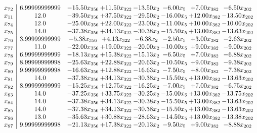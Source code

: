\documentclass[8pt]{article}
\begin{document}
\[\begin{array}{c| c c@{\hskip 2pt} c@{\hskip 2pt} c@{\hskip 2pt} c@{\hskip 2pt} c@{\hskip 2pt} c@{\hskip 2pt} }
 x_{72}   &  6.99999999999 & -15.50 x_{356} & + 11.50 x_{322} & -13.50 x_{2} & -6.00 x_{5} & +  7.00 x_{382} & -6.50 x_{202}\\
 x_{11}   &  12.0 & -39.50 x_{356} & + 37.50 x_{322} & -29.50 x_{2} & -16.00 x_{5} & + 12.00 x_{382} & -13.50 x_{202}\\
 x_{74}   &  12.0 & -25.00 x_{356} & + 22.00 x_{322} & -23.00 x_{2} & -11.00 x_{5} & + 10.00 x_{382} & -10.00 x_{202}\\
 x_{75}   &  14.0 & -37.38 x_{356} & + 34.13 x_{322} & -30.38 x_{2} & -15.50 x_{5} & + 13.00 x_{382} & -13.63 x_{202}\\
 x_{76}   &  3.99999999999 & -5.38 x_{356} & +  4.13 x_{322} & -6.38 x_{2} & -2.50 x_{5} & +  3.00 x_{382} & -2.63 x_{202}\\
 x_{77}   &  11.0 & -22.00 x_{356} & + 19.00 x_{322} & -20.00 x_{2} & -10.00 x_{5} & +  9.00 x_{382} & -9.00 x_{202}\\
 x_{78}   &  6.99999999999 & -18.13 x_{356} & + 15.38 x_{322} & -15.13 x_{2} & -6.50 x_{5} & +  7.00 x_{382} & -6.88 x_{202}\\
 x_{79}   &  8.99999999998 & -25.63 x_{356} & + 22.88 x_{322} & -20.63 x_{2} & -10.50 x_{5} & +  9.00 x_{382} & -9.38 x_{202}\\
 x_{80}   &  9.99999999998 & -16.63 x_{356} & + 12.88 x_{322} & -16.63 x_{2} & -7.50 x_{5} & +  8.00 x_{382} & -7.38 x_{202}\\
 x_{81}   &  14.0 & -37.38 x_{356} & + 34.13 x_{322} & -30.38 x_{2} & -15.50 x_{5} & + 13.00 x_{382} & -13.63 x_{202}\\
 x_{82}   &  8.99999999999 & -15.25 x_{356} & + 12.75 x_{322} & -16.25 x_{2} & -7.00 x_{5} & +  7.00 x_{382} & -6.75 x_{202}\\
 x_{83}   &  14.0 & -37.25 x_{356} & + 33.75 x_{322} & -30.25 x_{2} & -15.00 x_{5} & + 13.00 x_{382} & -13.75 x_{202}\\
 x_{84}   &  14.0 & -37.38 x_{356} & + 34.13 x_{322} & -30.38 x_{2} & -15.50 x_{5} & + 13.00 x_{382} & -13.63 x_{202}\\
 x_{85}   &  14.0 & -37.38 x_{356} & + 34.13 x_{322} & -30.38 x_{2} & -15.50 x_{5} & + 13.00 x_{382} & -13.63 x_{202}\\
 x_{86}   &  13.0 & -35.63 x_{356} & + 30.88 x_{322} & -28.63 x_{2} & -14.50 x_{5} & + 13.00 x_{382} & -13.38 x_{202}\\
 x_{87}   &  9.99999999998 & -21.13 x_{356} & + 17.38 x_{322} & -20.13 x_{2} & -9.50 x_{5} & +  9.00 x_{382} & -8.88 x_{202}\\

\end{array}\]
\end{document}
